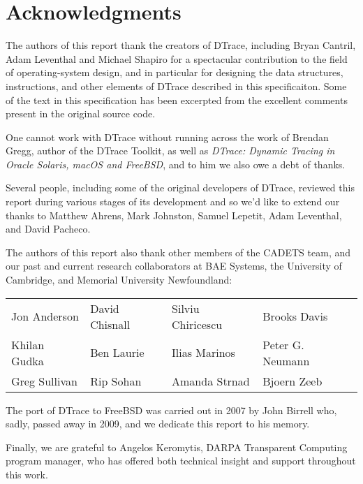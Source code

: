 \section*{Acknowledgments}
The authors of this report thank the creators of DTrace, including
Bryan Cantril, Adam Leventhal and Michael Shapiro for a spectacular
contribution to the field of operating-system design, and in
particular for designing the data structures, instructions, and other
elements of DTrace described in this specificaiton.  Some of the text
in this specification has been excerpted from the excellent comments
present in the original source code.

One cannot work with DTrace without running across the work of Brendan
Gregg, author of the DTrace Toolkit, as well as \emph{DTrace: Dynamic
  Tracing in Oracle Solaris, macOS and FreeBSD}, and to him we also
owe a debt of thanks.

Several people, including some of the original developers of DTrace,
reviewed this report during various stages of its development and so
we'd like to extend our thanks to Matthew Ahrens, Mark Johnston,
Samuel Lepetit, Adam Leventhal, and David Pacheco.

The authors of this report also thank other members of the CADETS team, and
our past and current research collaborators at BAE Systems, the University of
Cambridge, and Memorial University Newfoundland:

%
%
\begin{tabular}{llll}
  Jon Anderson & David Chisnall & Silviu Chiricescu & Brooks Davis \\
  Khilan Gudka & Ben Laurie & Ilias Marinos & Peter G. Neumann \\
  Greg Sullivan & Rip Sohan & Amanda Strnad & Bjoern Zeeb
\end{tabular}

\bigskip

%
%
%

The port of DTrace to FreeBSD was carried out in 2007 by John Birrell
who, sadly, passed away in 2009, and we dedicate this report to his
memory.

\noindent
Finally, we are grateful to Angelos Keromytis, DARPA Transparent Computing
program manager, who has offered both technical insight and support throughout
this work.
